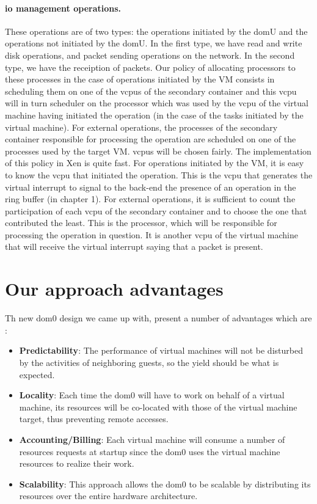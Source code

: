 \paragraph{\acrshort{io} management operations.}These operations are of two types: the operations initiated by the domU and the operations not initiated by the domU. In the first type, we have read and write disk operations, and packet sending operations on the network. In the second type, we have the receiption of packets. Our policy of allocating processors to these processes in the case of operations initiated by the VM consists in scheduling them on one of the \acrshort{vcpu}s of the secondary container and this \acrshort{vcpu} will in turn scheduler on the processor which was used by the \acrshort{vcpu} of the virtual machine having initiated the operation (in the case of the tasks initiated by the virtual machine). For external operations, the processes of the secondary container responsible for processing the operation are scheduled on one of the processes used by the target VM. \acrshort{vcpu}s will be chosen fairly. The implementation of this policy in Xen is quite fast. For operations initiated by the VM, it is easy to know the \acrshort{vcpu} that initiated the operation. This is the \acrshort{vcpu} that generates the virtual interrupt to signal to the back-end the presence of an operation in the ring buffer (in chapter 1). For external operations, it is sufficient to count the participation of each \acrshort{vcpu} of the secondary container and to choose the one that contributed the least. This is the processor, which will be responsible for processing the operation in question.  It is another \acrshort{vcpu} of the virtual machine that will receive the virtual interrupt saying that a packet is present.

\section{Our approach advantages}

Th new dom0 design we came up with, present a number of advantages which are : 

\begin{itemize}
    \item \textbf{Predictability}: The performance of virtual machines will not be disturbed by the activities of neighboring guests, so the yield should be what is expected.
    \item \textbf{Locality}: Each time the dom0 will have to work on behalf of a virtual machine, its resources will be co-located with those of the virtual machine target, thus preventing remote accesses.
    \item \textbf{Accounting/Billing}: Each virtual machine will consume a number of resources requests at startup since the dom0 uses the virtual machine resources to realize their work.
    
    \item \textbf{Scalability}: This approach allows the dom0 to be scalable by distributing its resources over the entire hardware architecture.
\end{itemize}

